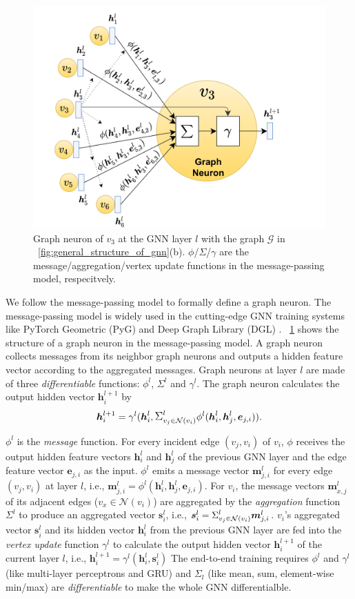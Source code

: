 \begin{figure}
	\centering
	\includegraphics[width=0.5\columnwidth]{figs/illustration/GNN_Unit.png}
	\caption{Graph neuron of $v_3$ at the GNN layer $l$ with the graph $\mathcal{G}$ in \figurename~\ref{fig:general_structure_of_gnn}(b). $\phi$/$\Sigma$/$\gamma$ are the message/aggregation/vertex update functions in the message-passing model, respecitvely.}
	\label{fig:graph_neuron_structure}
\end{figure}

We follow the message-passing model \cite{gilmer_messgae_passing} to formally define a graph neuron.
The message-passing model is widely used in the cutting-edge GNN training systems like PyTorch Geometric (PyG) \cite{PyG} and Deep Graph Library (DGL) \cite{DGL}.
\figurename~\ref{fig:graph_neuron_structure} shows the structure of a graph neuron in the message-passing model.
A graph neuron collects messages from its neighbor graph neurons and outputs a hidden feature vector according to the aggregated messages.
Graph neurons at layer $l$ are made of three \emph{differentiable} functions: $\phi^l$, $\Sigma^l$ and $\gamma^l$.
The graph neuron calculates the output hidden vector $\boldsymbol{h}^{l+1}_i$ by
$$
	\boldsymbol{h}^{l+1}_i = \gamma^l(\boldsymbol{h}^l_i, \mathlarger{\Sigma}^l_{v_j \in \mathcal{N}(v_i)}{\phi^l(\boldsymbol{h}^l_i, \boldsymbol{h}^l_j,	\boldsymbol{e}_{j,i})}).
$$

$\phi^l$ is the \emph{message} function.
For every incident edge $(v_j, v_i)$ of $v_i$, $\phi$ receives the output hidden feature vectors $\boldsymbol{h}^l_i$ and $\boldsymbol{h}^l_j$ of the previous GNN layer and the edge feature vector $\boldsymbol{e}_{j,i}$ as the input.
$\phi^l$ emits a message vector $\boldsymbol{m}^l_{j,i}$ for every edge $(v_j, v_i)$ at layer $l$, i.e., $\boldsymbol{m}^l_{j,i}=\phi^l(\boldsymbol{h}^l_i, \boldsymbol{h}^l_j, \boldsymbol{e}_{j,i})$.
For $v_i$, the message vectors $\boldsymbol{m}^l_{x,j}$ of its adjacent edges ($v_x \in \mathcal{N}(v_i)$) are aggregated by the \emph{aggregation} function $\Sigma^l$ to produce an aggregated vector $\boldsymbol{s}^l_i$, i.e., $\boldsymbol{s}^l_i=\mathlarger{\Sigma}^l_{v_j \in \mathcal{N}(v_i)}\boldsymbol{m}^l_{j,i}$.
$v_i$'s aggregated vector $\boldsymbol{s}^l_i$ and its hidden vector $\boldsymbol{h}^l_i$ from the previous GNN layer are fed into the \emph{vertex update} function $\gamma^l$ to calculate the output hidden vector $\boldsymbol{h}^{l+1}_i$ of the current layer $l$, i.e., $\boldsymbol{h}^{l+1}_i = \gamma^l(\boldsymbol{h}^l_i, \boldsymbol{s}^l_i)$
The end-to-end training requires $\phi^l$ and $\gamma^l$ (like multi-layer perceptrons and GRU) and $\Sigma_l$ (like mean, sum, element-wise min/max) are \emph{differentiable} to make the whole GNN differentialble.

